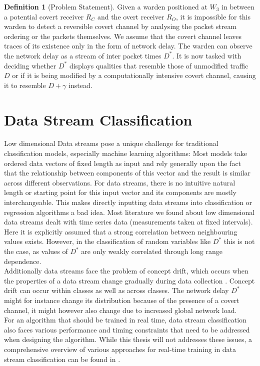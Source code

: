 \documentclass[12pt,a4paper,automark, toc=bib]{scrreprt}
\theoremstyle{definition}
\newtheorem{definition}{Definition}[chapter]
\begin{document}
			\begin{definition}[Problem Statement]
				Given a warden positioned at $W_3$ in between a potential covert receiver $R_C$ and the overt receiver $R_O$, it is impossible for this warden to detect a reversible covert channel by analysing the packet stream ordering or the packets themselves. We assume that the covert channel leaves traces of its existence only in the form of network delay. The warden can observe the network delay as a stream of inter packet times $D^*$. It is now tasked with deciding whether $D^*$ displays qualities that resemble those of unmodified traffic $D$ or if it is being modified by a computationally intensive covert channel, causing it to resemble $D + \gamma$ instead.
			\end{definition}
			
		
		\section{Data Stream Classification}
		
			Low dimensional Data streams pose a unique challenge for traditional classification models, especially machine learning algorithms\cite{Faouzi2022}: Most models take ordered data vectors of fixed length as input and rely generally upon the fact that the relationship between components of this vector and the result is similar across different observations. For data streams, there is no intuitive natural length or starting point for this input vector and its components are mostly interchangeable. This makes directly inputting data streams into classification or regression algorithms a bad idea. Most literature we found about low dimensional data streams dealt with time series data (measurements taken at fixed intervals). Here it is explicitly assumed that a strong correlation between neighbouring values exists. However, in the classification of random variables like $D^*$ this is not the case, as values of $D^*$ are only weakly correlated through long range dependence.\\
			Additionally data streams face the problem of concept drift, which occurs when the properties of a data stream change gradually during data collection  \cite{Janardan2017}. Concept drift can occur within classes as well as across classes. The network delay $D^*$ might for instance change its distribution because of the presence of a covert channel, it might however also change due to increased global network load.\\
			For an algorithm that should be trained in real time, data stream classification also faces various performance and timing constraints that need to be addressed when designing the algorithm. While this thesis will not addresses these issues, a comprehensive overview of various approaches for real-time training in data stream classification can be found in  \cite{Nguyen2015}. \\
			
\end{document}
